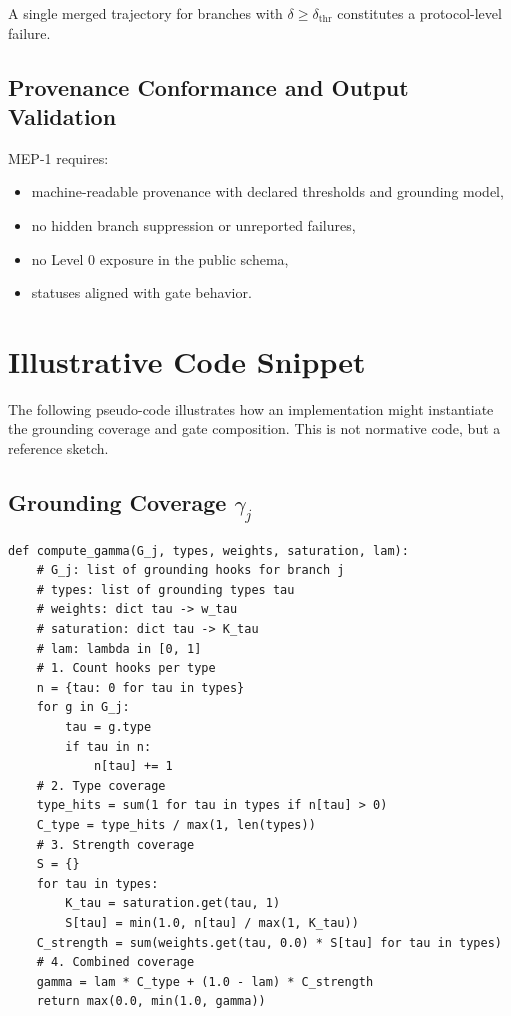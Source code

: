 \documentclass[11pt, a4paper]{article}
\begin{document}
A single merged trajectory for branches with $\delta\ge\delta_{\mathrm{thr}}$ constitutes a protocol-level failure.

\subsection{Provenance Conformance and Output Validation}

MEP-1 requires:
\begin{itemize}[nosep]
  \item machine-readable provenance with declared thresholds and grounding model,
  \item no hidden branch suppression or unreported failures,
  \item no Level 0 exposure in the public schema,
  \item statuses aligned with gate behavior.
\end{itemize}

\section{Illustrative Code Snippet}

The following pseudo-code illustrates how an implementation might instantiate the grounding coverage and gate composition.
This is not normative code, but a reference sketch.

\subsection*{Grounding Coverage $\gamma_j$}

\begin{verbatim}
def compute_gamma(G_j, types, weights, saturation, lam):
    # G_j: list of grounding hooks for branch j
    # types: list of grounding types tau
    # weights: dict tau -> w_tau
    # saturation: dict tau -> K_tau
    # lam: lambda in [0, 1]
    # 1. Count hooks per type
    n = {tau: 0 for tau in types}
    for g in G_j:
        tau = g.type
        if tau in n:
            n[tau] += 1
    # 2. Type coverage
    type_hits = sum(1 for tau in types if n[tau] > 0)
    C_type = type_hits / max(1, len(types))
    # 3. Strength coverage
    S = {}
    for tau in types:
        K_tau = saturation.get(tau, 1)
        S[tau] = min(1.0, n[tau] / max(1, K_tau))
    C_strength = sum(weights.get(tau, 0.0) * S[tau] for tau in types)
    # 4. Combined coverage
    gamma = lam * C_type + (1.0 - lam) * C_strength
    return max(0.0, min(1.0, gamma))
\end{verbatim}
\end{document}
